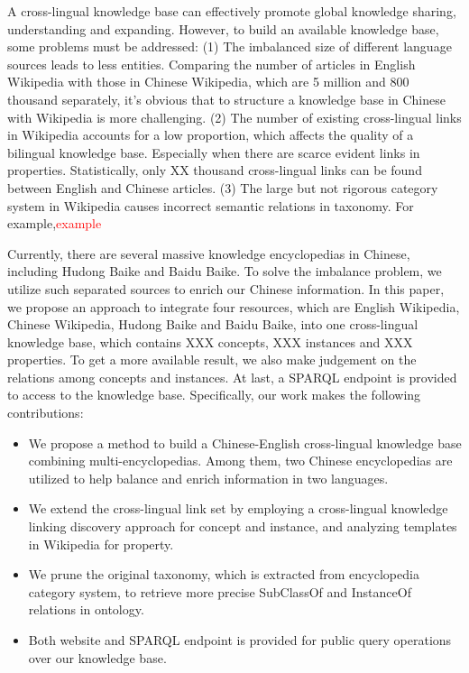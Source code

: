 \documentclass[runningheads,a4paper]{llncs}
\begin{document}
A cross-lingual knowledge base can effectively promote global knowledge sharing, understanding and expanding. However, to build an available knowledge base, some problems must be addressed: (1) The imbalanced size of different language sources leads to less entities. Comparing the number of articles in English Wikipedia with those in Chinese Wikipedia, which are 5 million and 800 thousand separately, it's obvious that to structure a knowledge base in Chinese with Wikipedia is more challenging. (2) The number of existing cross-lingual links in Wikipedia accounts for a low proportion, which affects the quality of a bilingual knowledge base. Especially when there are scarce evident links in properties. Statistically, only XX thousand cross-lingual links can be found between English and Chinese articles. (3) The large but not rigorous category system in Wikipedia causes incorrect semantic relations in taxonomy. For example,\textcolor{red}{example}



Currently, there are several massive knowledge encyclopedias in Chinese, including Hudong Baike and Baidu Baike. To solve the imbalance problem, we utilize such separated sources to enrich our Chinese information. In this paper, we propose an approach to integrate four resources, which are English Wikipedia, Chinese Wikipedia, Hudong Baike and Baidu Baike, into one cross-lingual knowledge base, which contains XXX concepts, XXX instances and XXX properties. To get a more available result, we also make judgement on the relations among concepts and instances. At last, a SPARQL endpoint is provided to access to the knowledge base. Specifically, our work makes the following contributions:
\begin{itemize}
  \item We propose a method to build a Chinese-English cross-lingual knowledge base combining multi-encyclopedias. Among them, two  Chinese encyclopedias are utilized to help balance and enrich information in two languages.
  \item We extend the cross-lingual link set by employing a cross-lingual knowledge linking discovery approach for concept and instance, and analyzing templates in Wikipedia for property.
  \item We prune the original taxonomy, which is extracted from encyclopedia category system, to retrieve more precise SubClassOf and InstanceOf relations in ontology.
  \item Both website and SPARQL endpoint is provided for public query operations over our knowledge base.
\end{itemize}
\end{document}
